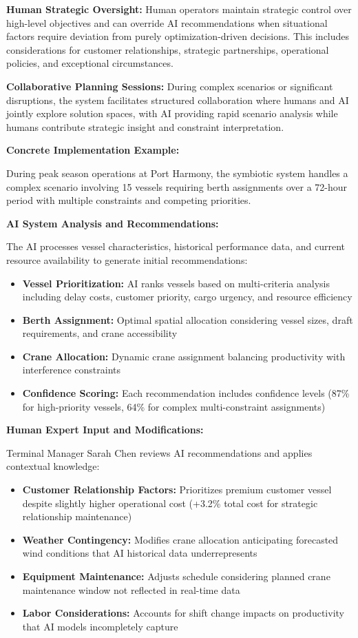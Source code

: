 \documentclass{article}
\begin{document}
\textbf{Human Strategic Oversight:}
Human operators maintain strategic control over high-level objectives and can override AI recommendations when situational factors require deviation from purely optimization-driven decisions. This includes considerations for customer relationships, strategic partnerships, operational policies, and exceptional circumstances.

\textbf{Collaborative Planning Sessions:}
During complex scenarios or significant disruptions, the system facilitates structured collaboration where humans and AI jointly explore solution spaces, with AI providing rapid scenario analysis while humans contribute strategic insight and constraint interpretation.

\textbf{Concrete Implementation Example:}

During peak season operations at Port Harmony, the symbiotic system handles a complex scenario involving 15 vessels requiring berth assignments over a 72-hour period with multiple constraints and competing priorities.

\textbf{AI System Analysis and Recommendations:}

The AI processes vessel characteristics, historical performance data, and current resource availability to generate initial recommendations:

\begin{itemize}
\item \textbf{Vessel Prioritization:} AI ranks vessels based on multi-criteria analysis including delay costs, customer priority, cargo urgency, and resource efficiency
\item \textbf{Berth Assignment:} Optimal spatial allocation considering vessel sizes, draft requirements, and crane accessibility
\item \textbf{Crane Allocation:} Dynamic crane assignment balancing productivity with interference constraints
\item \textbf{Confidence Scoring:} Each recommendation includes confidence levels (87\% for high-priority vessels, 64\% for complex multi-constraint assignments)
\end{itemize}

\textbf{Human Expert Input and Modifications:}

Terminal Manager Sarah Chen reviews AI recommendations and applies contextual knowledge:

\begin{itemize}
\item \textbf{Customer Relationship Factors:} Prioritizes premium customer vessel despite slightly higher operational cost (+3.2\% total cost for strategic relationship maintenance)
\item \textbf{Weather Contingency:} Modifies crane allocation anticipating forecasted wind conditions that AI historical data underrepresents
\item \textbf{Equipment Maintenance:} Adjusts schedule considering planned crane maintenance window not reflected in real-time data
\item \textbf{Labor Considerations:} Accounts for shift change impacts on productivity that AI models incompletely capture
\end{itemize}
\end{document}
